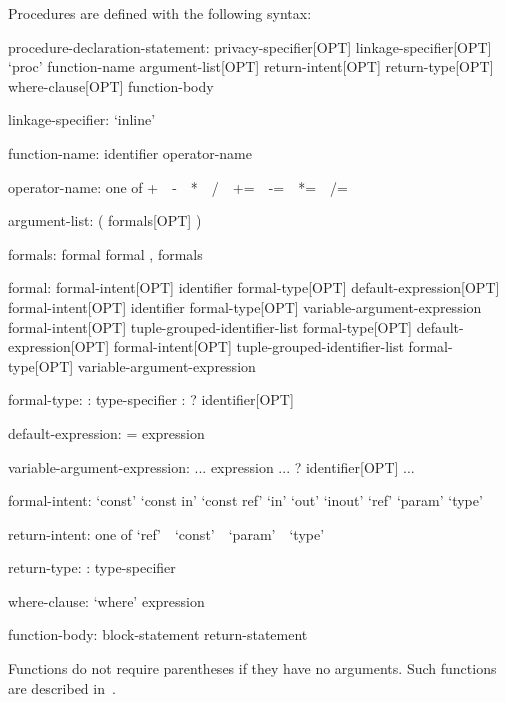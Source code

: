 Procedures are defined with the following syntax:
\begin{syntax}
procedure-declaration-statement:
  privacy-specifier[OPT] linkage-specifier[OPT] `proc' function-name argument-list[OPT] return-intent[OPT] return-type[OPT] where-clause[OPT]
    function-body

linkage-specifier:
  `inline'

function-name:
  identifier
  operator-name

operator-name: one of
  + $ $ $ $ - $ $ $ $ * $ $ $ $ / $ $ $ $ %
  += $ $ $ $ -= $ $ $ $ *= $ $ $ $ /= $ $ $ $ %

argument-list:
  ( formals[OPT] )

formals:
  formal
  formal , formals

formal:
  formal-intent[OPT] identifier formal-type[OPT] default-expression[OPT]
  formal-intent[OPT] identifier formal-type[OPT] variable-argument-expression
  formal-intent[OPT] tuple-grouped-identifier-list formal-type[OPT] default-expression[OPT]
  formal-intent[OPT] tuple-grouped-identifier-list formal-type[OPT] variable-argument-expression



formal-type:
  : type-specifier
  : ? identifier[OPT]

default-expression:
  = expression

variable-argument-expression:
  ... expression
  ... ? identifier[OPT]
  ...

formal-intent:
  `const'
  `const in'
  `const ref'
  `in'
  `out'
  `inout'
  `ref'
  `param'
  `type'

return-intent: one of
  `ref' $ $ $ $ `const' $ $ $ $ `param' $ $ $ $ `type'

return-type:
  : type-specifier

where-clause:
  `where' expression

function-body:
  block-statement
  return-statement
\end{syntax}


Functions do not require parentheses if they have no arguments.  Such
functions are described in~.

